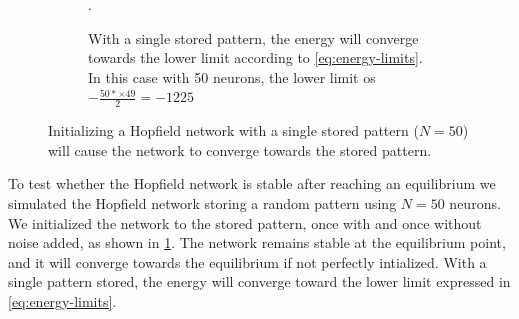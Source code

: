 \begin{figure}[H]
\begin{subfigure}{0.49\textwidth}
        \caption{With a single stored pattern, the energy will converge towards the lower limit according to \cref{eq:energy-limits}. In this case with 50 neurons, the lower limit os $-\frac{50*\times 49}{2} = -1225$}.
    \end{subfigure}
    \caption{Initializing a Hopfield network with a single stored pattern ($N = 50$) will cause the network to converge towards the stored pattern.}
    \label{fig:stable}
\end{figure}
To test whether the Hopfield network is stable after reaching an equilibrium we simulated the Hopfield network storing a random pattern using $N=50$ neurons. We initialized the network to the stored pattern, once with and once without noise added, as shown in \cref{fig:stable}. The network remains stable at the equilibrium point, and it will converge towards the equilibrium if not perfectly intialized. With a single pattern stored, the energy will converge toward the lower limit expressed in \cref{eq:energy-limits}.


